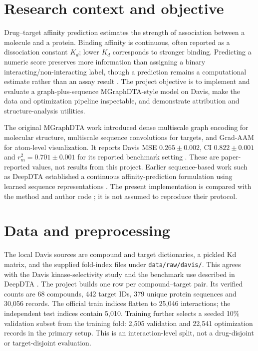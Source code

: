 \section{Research context and objective}
Drug--target affinity prediction estimates the strength of association between a molecule and a protein. Binding affinity is continuous, often reported as a dissociation constant $K_d$; lower $K_d$ corresponds to stronger binding. Predicting a numeric score preserves more information than assigning a binary interacting/non-interacting label, though a prediction remains a computational estimate rather than an assay result \citep{ozturk2018deepdta,yang2022mgraphdta}. The project objective is to implement and evaluate a graph-plus-sequence MGraphDTA-style model on Davis, make the data and optimization pipeline inspectable, and demonstrate attribution and structure-analysis utilities.

The original MGraphDTA work introduced dense multiscale graph encoding for molecular structure, multiscale sequence convolutions for targets, and Grad-AAM for atom-level visualization. It reports Davis MSE $0.265\pm0.002$, CI $0.822\pm0.001$ and $r_m^2=0.701\pm0.001$ for its reported benchmark setting \citep{yang2022mgraphdta}. These are paper-reported values, not results from this project. Earlier sequence-based work such as DeepDTA established a continuous affinity-prediction formulation using learned sequence representations \citep{ozturk2018deepdta}. The present implementation is compared with the method and author code \citep{mgraphdtaauthorscode}; it is not assumed to reproduce their protocol.

\section{Data and preprocessing}
The local Davis sources are compound and target dictionaries, a pickled Kd matrix, and the supplied fold-index files under \texttt{data/raw/davis/}. This agrees with the Davis kinase-selectivity study and the benchmark use described in DeepDTA \citep{davis2011,davisdeepdta,ozturk2018deepdta}. The project builds one row per compound--target pair. Its verified counts are 68 compounds, 442 target IDs, 379 unique protein sequences and 30,056 records. The official train indices flatten to 25,046 interactions; the independent test indices contain 5,010. Training further selects a seeded 10\% validation subset from the training fold: 2,505 validation and 22,541 optimization records in the primary setup. This is an interaction-level split, not a drug-disjoint or target-disjoint evaluation.

